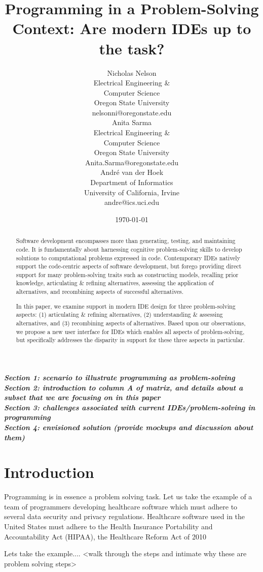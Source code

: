 \documentclass{ppig}
\title{Programming in a Problem-Solving Context: Are modern IDEs up to the task?}
\author{Nicholas Nelson \\
  Electrical Engineering \&\\ Computer Science \\
  Oregon State University \\
  nelsonni@oregonstate.edu \\
  \And
  Anita Sarma \\
  Electrical Engineering \&\\ Computer Science \\
  Oregon State University \\
  Anita.Sarma@oregonstate.edu \\
  \And
  André van der Hoek \\
  Department of Informatics \\
  University of California, Irvine \\
  andre@ics.uci.edu}
\date{\today}
\newcommand{\bold}[1]{\textit{\textbf{\color{aoblue}#1}}}
\begin{document}
\maketitle
\thispagestyle{empty}

\begin{abstract}
Software development encompasses more than generating, testing, and maintaining code.
It is fundamentally about harnessing cognitive problem-solving skills to develop solutions to computational problems expressed in code.
Contemporary IDEs natively support the code-centric aspects of software development, but forego providing direct support for many problem-solving traits such as constructing models, recalling prior knowledge, articulating \& refining alternatives, assessing the application of alternatives, and recombining aspects of successful alternatives.

In this paper, we examine support in modern IDE design for three problem-solving aspects: (1) articulating \& refining alternatives, (2) understanding \& assessing alternatives, and (3) recombining aspects of alternatives.
Based upon our observations, we propose a new user interface for IDEs which enables all aspects of problem-solving, but specifically addresses the disparity in support for these three aspects in particular. 
\end{abstract}

\bold{Section 1: scenario to illustrate programming as problem-solving\\
Section 2: introduction to column A of matrix, and details about a subset that we are focusing on in this paper\\
Section 3: challenges associated with current IDEs/problem-solving in programming\\
Section 4: envisioned solution (provide mockups and discussion about them)}

\section{Introduction}

Programming is in essence a problem solving task.
Let us take the example of a team of programmers developing healthcare software which must adhere to several data security and privacy regulations.
Healthcare software used in the United States must adhere to the Health Insurance Portability and Accountability Act (HIPAA), the Healthcare Reform Act of 2010


Lets take the example.... <walk through the steps and intimate why these are problem solving steps>
\end{document}

